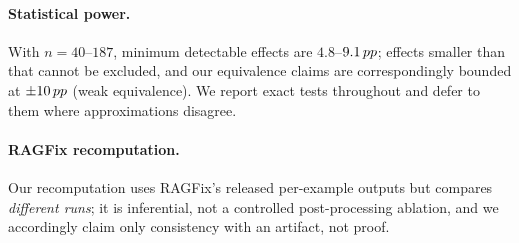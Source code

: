 \paragraph{Statistical power.} With $n{=}40$--$187$, minimum detectable
effects are $4.8$--$9.1\,pp$; effects smaller than that cannot be excluded,
and our equivalence claims are correspondingly bounded at $\pm 10\,pp$ (weak
equivalence). We report exact tests throughout and defer to them where
approximations disagree.

\paragraph{RAGFix recomputation.} Our recomputation uses RAGFix's released
per-example outputs but compares \emph{different runs}; it is inferential,
not a controlled post-processing ablation, and we accordingly claim only
consistency with an artifact, not proof.
